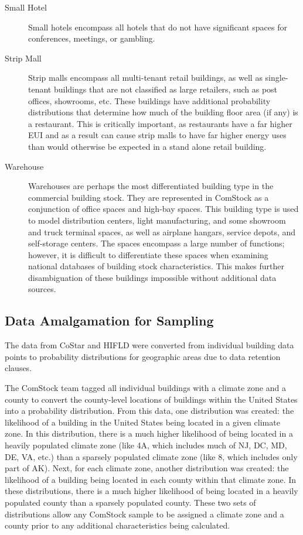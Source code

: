 \begin{description}
\item[Small Hotel] Small hotels encompass all hotels that do not have significant spaces for conferences, meetings, or gambling.
\item[Strip Mall] Strip malls encompass all multi-tenant retail buildings, as well as single-tenant buildings that are not classified as large retailers, such as post offices, showrooms, etc. These buildings have additional probability distributions that determine how much of the building floor area (if any) is a restaurant. This is critically important, as restaurants have a far higher EUI and as a result can cause strip malls to have far higher energy uses than would otherwise be expected in a stand alone retail building.
\item[Warehouse] Warehouses are perhaps the most differentiated building type in the commercial building stock. They are represented in ComStock as a conjunction of office spaces and high-bay spaces. This building type is used to model distribution centers, light manufacturing, and some showroom and truck terminal spaces, as well as airplane hangars, service depots, and self-storage centers. The spaces encompass a large number of functions; however, it is difficult to differentiate these spaces when examining national databases of building stock characteristics. This makes further disambiguation of these buildings impossible without additional data sources.
\end{description}

\subsection{Data Amalgamation for Sampling} \label{sec:3.1.3data amalgamation for sampling}

The data from CoStar and HIFLD were converted from individual building data points to probability distributions for geographic areas due to data retention clauses. 

The ComStock team tagged all individual buildings with a climate zone and a county to convert the county-level locations of buildings within the United States into a probability distribution. From this data, one distribution was created: the likelihood of a building in the United States being located in a given climate zone. In this distribution, there is a much higher likelihood of being located in a heavily populated climate zone (like 4A, which includes much of NJ, DC, MD, DE, VA, etc.) than a sparsely populated climate zone (like 8, which includes only part of AK). Next, for each climate zone, another distribution was created: the likelihood of a building being located in each county within that climate zone. In these distributions, there is a much higher likelihood of being located in a heavily populated county than a sparsely populated county. These two sets of distributions allow any ComStock sample to be assigned a climate zone and a county  prior to any additional characteristics being calculated.

